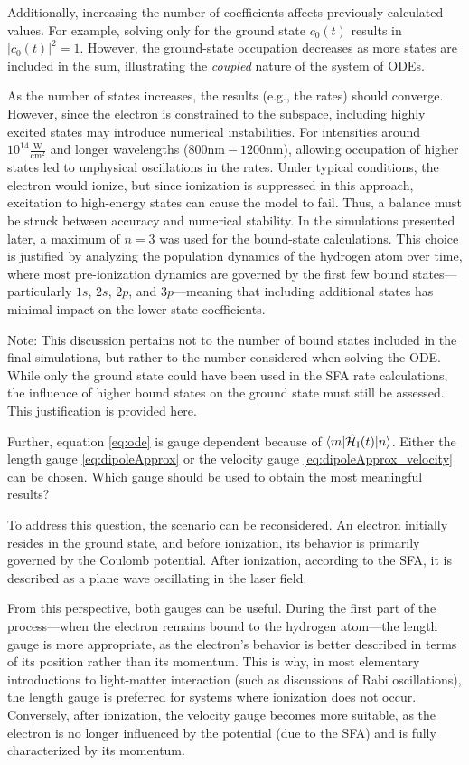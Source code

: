 Additionally, increasing the number of coefficients affects previously calculated values.
For example, solving only for the ground state $c_0(t)$ results in $|c_0(t)|^2 = 1$.
However, the ground-state occupation decreases as more states are included in the sum, illustrating the \emph{coupled} nature of the system of ODEs.

As the number of states increases, the results (e.g., the rates) should converge.
However, since the electron is constrained to the subspace, including highly excited states may introduce numerical instabilities.
For intensities around $10^{14}\frac{\mathrm{W}}{\mathrm{cm}^2}$ and longer wavelengths ($800\mathrm{nm}-1200\mathrm{nm}$), allowing occupation of higher states led to unphysical oscillations in the rates.
Under typical conditions, the electron would ionize, but since ionization is suppressed in this approach, excitation to high-energy states can cause the model to fail.
Thus, a balance must be struck between accuracy and numerical stability.
In the simulations presented later, a maximum of $n=3$ was used for the bound-state calculations.
This choice is justified by analyzing the population dynamics of the hydrogen atom over time, where most pre-ionization dynamics are governed by the first few bound states—particularly $1s$, $2s$, $2p$, and $3p$—meaning that including additional states has minimal impact on the lower-state coefficients.

Note: This discussion pertains not to the number of bound states included in the final simulations, but rather to the number considered when solving the ODE.
While only the ground state could have been used in the SFA rate calculations, the influence of higher bound states on the ground state must still be assessed.
This justification is provided here.




\medskip
Further, equation \eqref{eq:ode} is gauge dependent because of $\braket{m|\hat{\mathcal{H}}_{\mathrm{I}}(t)|n}$.
Either the length gauge \eqref{eq:dipoleApprox} or the velocity gauge \eqref{eq:dipoleApprox_velocity} can be chosen.
Which gauge should be used to obtain the most meaningful results?

To address this question, the scenario can be reconsidered.
An electron initially resides in the ground state, and before ionization, its behavior is primarily governed by the Coulomb potential.
After ionization, according to the SFA, it is described as a plane wave oscillating in the laser field.

From this perspective, both gauges can be useful.
During the first part of the process—when the electron remains bound to the hydrogen atom—the length gauge is more appropriate, as the electron's behavior is better described in terms of its position rather than its momentum.
This is why, in most elementary introductions to light-matter interaction (such as discussions of Rabi oscillations), the length gauge is preferred for systems where ionization does not occur.
Conversely, after ionization, the velocity gauge becomes more suitable, as the electron is no longer influenced by the potential (due to the SFA) and is fully characterized by its momentum.

